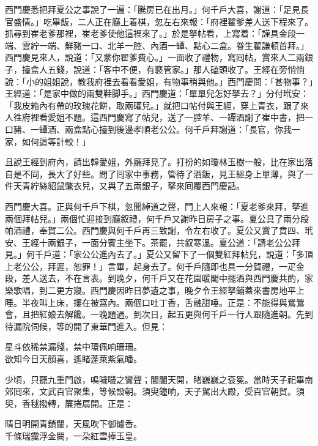 西門慶悉把拜夏公之事說了一遍：「騰房已在出月。」何千戶大喜，謝道：「足見長官盛情。」吃畢飯，二人正在廳上着棋，忽左右來報：「府裡翟爹差人送下程來了。抓尋到崔老爹那裡，崔老爹使他這裡來了。」{}於是拏帖看，上寫着：「謹具金段一端、雲紵一端、鮮豬一口、北羊一腔、內酒一罈、點心二盒。眷生翟謙頓首拜。」西門慶見來人，說道：「又蒙你翟爹費心。」一面收了禮物，寫囘帖，賞來人二兩銀子，擡盒人五錢，說道：「客中不便，有褻管家。」那人磕頭收了。王經在旁悄悄說：「小的姐姐說，教我府裡去看看愛姐，有物事稍與他。」西門慶問：「甚物事？」王經道：「是家中做的兩雙鞋脚手。」西門慶道：「單單兒怎好拏去？」分付玳安：「我皮箱內有帶的玫瑰花餅，取兩礶兒。」{}就把口帖付與王經，穿上青衣，跟了來人徃府裡看愛姐不題。這西門慶寫了帖兒，送了一腔羊、一罈酒謝了崔中書，把一口豬、一罈酒、兩盒點心擡到後邊孝順老公公。何千戶拜謝道：「長官，你我一家，如何這等計較！」

且說王經到府內，請出韓愛姐，外廳拜見了。打扮的如瓊林玉樹一般，比在家出落自是不同，長大了好些。問了囘家中事務，管待了酒飯，見王經身上單薄，與了一件天青紵絲貂鼠氅衣兒，又與了五兩銀子，拏來囘覆西門慶話。

西門慶大喜。正與何千戶下棋，忽聞綽道之聲，門上人來報：「夏老爹來拜，拏進兩個拜帖兒。」兩個忙迎接到廳叙禮，何千戶又謝昨日房子之事。夏公具了兩分段帕酒禮，奉賀二公。西門慶與何千戶再三致謝，令左右收了。夏公又賞了賁四、玳安、王經十兩銀子，一面分賓主坐下。茶罷，共叙寒溫。夏公道：「請老公公拜見。」何千戶道：「家公公進內去了。」夏公又留下了一個雙紅拜帖兒，說道：「多頂上老公公，拜遲，恕罪！」言畢，起身去了。何千戶隨即也具一分賀禮，一疋金段，差人送去，不在言表。到晚夕，何千戶又在花園暖閣中擺酒與西門慶共酌，家樂歌唱，到二更方寢。西門慶因昨日夢遺之事，晚夕令王經拏鋪蓋來書房地平上睡。半夜叫上床，摟在被窩內。{}兩個口吐丁香，舌融甜唾。正是：不能得與鶯鶯會，且把紅娘去解饞。一晚題過。到次日，起五更與何千戶一行人跟隨進朝。先到待漏院伺候，等的開了東華門進入。但見：

\begin{myquote}
星斗依稀禁漏殘，禁中環佩响珊珊。\\欲知今日天顏喜，遙睹蓬萊紫氣皤。
\end{myquote}

少頃，只聽九重門啟，鳴噦噦之鸞聲；閶闔天開，睹巍巍之袞冕。當時天子祀畢南郊囘來，文武百官聚集，等候設朝。須臾鐘响，天子駕出大殿，受百官朝賀。須臾，香毬撥轉，簾捲扇開。正是：

\begin{myquote}
晴日明開青鎖闥，天風吹下御爐香。\\千條瑞靄浮金闕，一朶紅雲捧玉皇。
\end{myquote}

